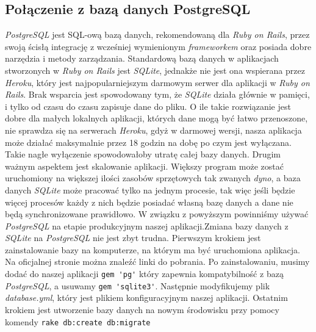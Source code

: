 \documentclass[openright]{xmgr}
\begin{document}
\subsection{Połączenie z bazą danych PostgreSQL}
\textit{PostgreSQL} jest SQL-ową bazą danych, rekomendowaną dla \textit{Ruby on Rails}, przez swoją ścisłą integrację z wcześniej wymienionym \textit{frameworkem} oraz posiada dobre narzędzia i metody zarządzania. Standardową bazą danych w aplikacjach stworzonych w \textit{Ruby on Rails} jest \textit{SQLite}, jednakże nie jest ona wspierana przez \textit{Heroku}, który jest najpopularniejszym darmowym serwer dla aplikacji w \textit{Ruby on Rails}. Brak wsparcia jest spowodowany tym, że \textit{SQLite} działa głównie w pamięci, i tylko od czasu do czasu zapisuje dane do pliku. O ile takie rozwiązanie jest dobre dla małych lokalnych aplikacji, których dane mogą być łatwo przenoszone, nie sprawdza się na serwerach \textit{Heroku}, gdyż w darmowej wersji, nasza aplikacja może działać maksymalnie przez 18 godzin na dobę po czym jest wyłączana. Takie nagłe wyłączenie spowodowałoby utratę całej bazy danych. Drugim ważnym aspektem jest skalowanie aplikacji. Większy program może zostać uruchomiony na większej ilości zasobów sprzętowych tak zwanych \textit{dyno}, a baza danych \textit{SQLite} może pracować tylko na jednym procesie, tak więc jeśli będzie więcej procesów każdy z nich będzie posiadać własną bazę danych a dane nie będą synchronizowane prawidłowo. W związku z powyższym powinniśmy używać \textit{PostgreSQL} na etapie produkcyjnym naszej aplikacji.\newline \indent Zmiana bazy danych z \textit{SQLite} na \textit{PostgreSQL} nie jest zbyt trudna. Pierwszym krokiem jest zainstalowanie bazy na komputerze, na którym ma być uruchomiona aplikacja. Na oficjalnej stronie można znaleźć linki do pobrania. Po zainstalowaniu, musimy dodać do naszej aplikacji \verb|gem 'pg'| który zapewnia kompatybilność z bazą \textit{PostgreSQL}, a usuwamy \verb|gem 'sqlite3'|. Następnie modyfikujemy plik \textit{database.yml}, który jest plikiem konfiguracyjnym naszej aplikacji. Ostatnim krokiem jest utworzenie bazy danych na nowym środowisku przy pomocy komendy \verb|rake db:create db:migrate|  
\end{document}
